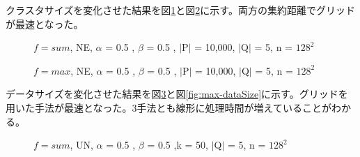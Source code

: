 \documentclass{deimj}
\begin{document}
クラスタサイズを変化させた結果を図\ref{fig:sum-clusterSize}と図\ref{fig:max-clusterSize}に示す。両方の集約距離でグリッドが最速となった。

\begin{figure}[H]
	\centering
    \caption{$f=sum$, NE, $\alpha$ = 0.5 , $\beta$ = 0.5 , $\mid$P$\mid$ = 10,000, $\mid$Q$\mid$ = 5, n = $128^2$}
    \label{fig:sum-clusterSize}
\end{figure}

\begin{figure}[H]
	\centering
    \caption{$f=max$, NE, $\alpha$ = 0.5 , $\beta$ = 0.5 , $\mid$P$\mid$ = 10,000, $\mid$Q$\mid$ = 5, n = $128^2$}
    \label{fig:max-clusterSize}
\end{figure}

データサイズを変化させた結果を図\ref{fig:sum-dataSize}と図\ref{fig:max-dataSize}に示す。グリッドを用いた手法が最速となった。3手法とも線形に処理時間が増えていることがわかる。

\begin{figure}[H]
	\centering
    \caption{$f=sum$, UN, $\alpha$ = 0.5 , $\beta$ = 0.5 ,k = 50, $\mid$Q$\mid$ = 5, n = $128^2$}
    \label{fig:sum-dataSize}
\end{figure}
\end{document}
